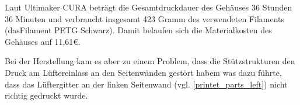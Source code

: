 \noindent Laut Ultimaker CURA beträgt die Gesamtdruckdauer des Gehäuses 36 Stunden 36 Minuten und verbraucht insgesamt 423 Gramm des verwendeten Filaments (dasFilament PETG Schwarz). 
Damit belaufen sich die Materialkosten des Gehäuses auf 11,61\euro{}.\par
\noindent Bei der Herstellung kam es aber zu einem Problem, dass die Stützstrukturen den Druck am Lüftereinlass an den Seitenwänden gestört habem was dazu führte, dass das Lüftergitter an der  linken Seitenwand (vgl. \ref{printet_parts_left}) nicht richtig gedruckt wurde.
